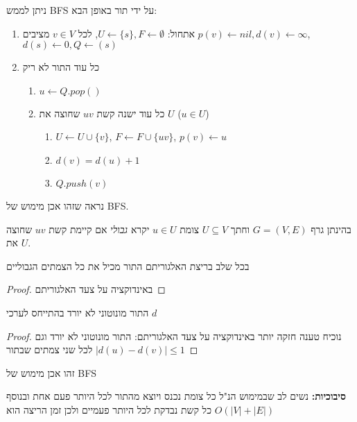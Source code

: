 ניתן לממש BFS על ידי תור באופן הבא:
\begin{enumerate}
\item
אתחול:
$U \leftarrow \{s\}, F \leftarrow \emptyset$, 
לכל 
$v \in V$
מציבים
$p(v) \leftarrow nil, d(v) \leftarrow \infty$,
$d(s) \leftarrow 0, Q \leftarrow (s)$
\item 
כל עוד התור לא ריק 
\begin{enumerate}
	\item
	$u \leftarrow Q.pop()$
\item
כל עוד ישנה קשת 
$uv$
שחוצה את $U$
($u \in U$)
		\begin{enumerate}
		\item
		$U \leftarrow U \cup \{v\}$,
		$F \leftarrow F \cup \{uv\}$,
		$p(v) \leftarrow u$
		\item
		$d(v) = d(u) + 1$
		\item
		$Q.push(v)$
		\end{enumerate}
	\end{enumerate}
\end{enumerate}
נראה שזהו אכן מימוש של BFS.
\begin{definition}
בהינתן גרף 
$G = (V,E)$
וחתך 
$U \subseteq V$
צומת 
$u \in U$
יקרא 
\emph{גבולי}
אם קיימת קשת $uv$ שחוצה את $U$.
\end{definition}

\begin{claim}
בכל שלב בריצת האלגוריתם התור מכיל את כל הצמתים הגבוליים
\end{claim}
\begin{proof}
באינדוקציה על צעד האלגוריתם 
\end{proof}

\begin{claim}
התור מונוטוני לא יורד בהתייחס לערכי 
$d$
\end{claim}
\begin{proof}
נוכיח טענה חזקה יותר באינדוקציה על צעד האלגוריתם: 
התור מונוטוני לא יורד וגם 
$|d(u) - d(v)| \leq 1$
לכל שני צמתים שבתור
\end{proof}

\begin{corollary}
זהו אכן מימוש של BFS
\end{corollary}

\textbf{סיבוכיות:}
נשים לב שבמימוש הנ"ל כל צומת נכנס ויוצא מהתור לכל היותר פעם אחת 
ובנוסף כל קשת נבדקת לכל היותר פעמיים ולכן זמן הריצה הוא 
$O(|V| + |E|)$

